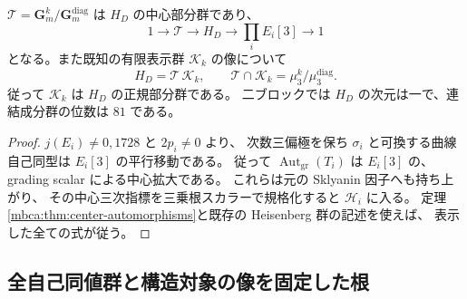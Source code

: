\begin{corollary}[相対ブロックトーラスと有限部分]
\label{mbca:cor:center-torus}
$\mathcal T=\mathbf G_m^k/\mathbf G_m^{\mathrm{diag}}$ は $H_D$ の中心部分群であり、
\[
 1\longrightarrow\mathcal T
 \longrightarrow H_D
 \longrightarrow\prod_iE_i[3]\longrightarrow1
\]
となる。また既知の有限表示群 $\mathcal K_k$ の像について
\[
 H_D=\mathcal T\,\mathcal K_k,\qquad
 \mathcal T\cap\mathcal K_k
       =\mu_3^k/\mu_3^{\mathrm{diag}}.
\]
従って $\mathcal K_k$ は $H_D$ の正規部分群である。
二ブロックでは $H_D$ の次元は一で、連結成分群の位数は $81$ である。
\end{corollary}
\begin{proof}
$j(E_i)\ne0,1728$ と $2p_i\ne0$ より、
次数三偏極を保ち $\sigma_i$ と可換する曲線自己同型は $E_i[3]$ の平行移動である。
従って $\operatorname{Aut}_{\mathrm{gr}}(T_i)$ は
$E_i[3]$ の、grading scalar による中心拡大である。
これらは元の Sklyanin 因子へも持ち上がり、
その中心三次指標を三乗根スカラーで規格化すると $\mathcal H_i$ に入る。
定理\ref{mbca:thm:center-automorphisms}と既存の Heisenberg 群の記述を使えば、
表示した全ての式が従う。
\end{proof}

\subsection{全自己同値群と構造対象の像を固定した根}

